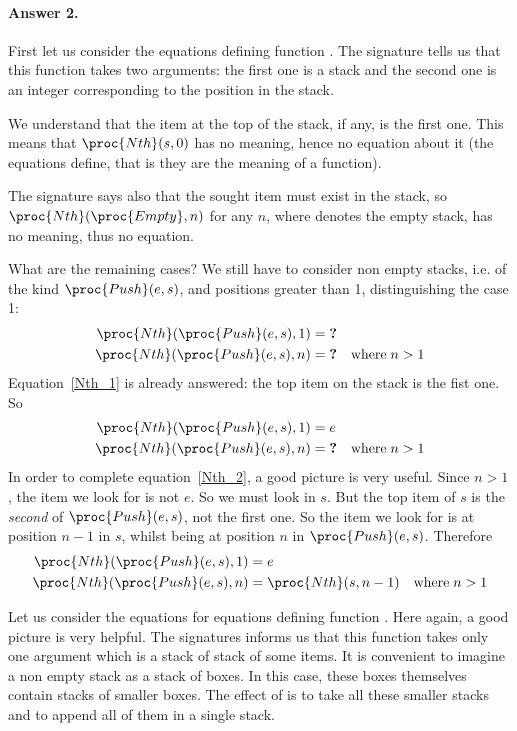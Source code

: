 \paragraph{Answer 2.} First let us consider the equations defining function
  . The signature tells us that this function takes two
  arguments: the first one is a stack and the second one is an integer
  corresponding to the position in the stack.

  We understand that the item at the top of the stack, if any, is the
  first one. This means that \(\proc{Nth} (s, 0)\) has no
  meaning, hence no equation about it (the equations define, that is
  they are the meaning of a function).

  The signature says also that the sought item must exist in the
  stack, so \(\proc{Nth} (\proc{Empty}, n)\) for any \(n\),
  where  denotes the empty stack, has no meaning, thus no
  equation.

  What are the remaining cases? We still have to consider non empty
  stacks, i.e. of the kind \(\proc{Push} (e, s)\), and
  positions greater than 1, distinguishing the case 1:
  \begin{align}
     \proc{Nth} (\proc{Push} (e, s), 1)
  &= \textbf{?} \label{Nth_1}\\
     \proc{Nth} (\proc{Push} (e, s), n)
  &= \textbf{?} & \text{where} \;n > 1 \label{Nth_2}
  \end{align}
  Equation~\ref{Nth_1} is already answered: the top item on the stack
  is the fist one. So
  \begin{align*}
     \proc{Nth} (\proc{Push} (e, s), 1)
  &= e\\
     \proc{Nth} (\proc{Push} (e, s), n)
  &= \textbf{?} & \text{where} \;n > 1
  \end{align*}
  In order to complete equation~\ref{Nth_2}, a good picture is very
  useful. Since \(n > 1\), the item we look for is not \(e\). So
  we must look in \(s\). But the top item of \(s\) is the
  \emph{second} of \(\proc{Push} (e, s)\), not the first
  one. So the item we look for is at position \(n-1\) in \(s\),
  whilst being at position \(n\) in \(\proc{Push} (e,
  s)\). Therefore
  \begin{align*}
     \proc{Nth} (\proc{Push} (e, s), 1)
  &= e\\
     \proc{Nth} (\proc{Push} (e, s), n)
  &= \proc{Nth} (s, n-1) & \text{where} \;n > 1
  \end{align*}

  Let us consider the equations for equations defining function
  . Here again, a good picture is very helpful. The
  signatures informs us that this function takes only one argument
  which is a stack of stack of some items. It is convenient to imagine
  a non empty stack as a stack of boxes. In this case, these boxes
  themselves contain stacks of smaller boxes. The effect of
   is to take all these smaller stacks and to append all
  of them in a single stack.

